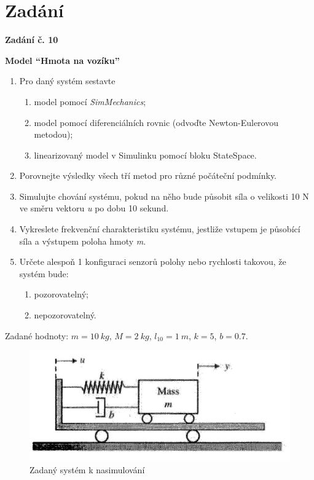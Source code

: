 \section{Zadání}

\textbf{Zadání č. 10}

\noindent \textbf{Model \enquote{Hmota na vozíku}}

\begin{enumerate}
    \item Pro daný systém sestavte
    
    \begin{enumerate}[label=\alph*)]
        \item model pomocí \textit{SimMechanics};
        \item model pomocí diferenciálních rovnic (odvoďte Newton-Eulerovou metodou);
        \item linearizovaný model v Simulinku pomocí bloku StateSpace.
    \end{enumerate}
    
    \item Porovnejte výsledky všech tří metod pro různé počáteční podmínky.
    \item Simulujte chování systému, pokud na něho bude působit síla o velikosti 10 N ve směru vektoru \textit{u} po dobu 10 sekund.
    \item Vykreslete frekvenční charakteristiku systému, jestliže vstupem je působící síla a výstupem poloha hmoty \textit{m}.
    \item Určete alespoň 1 konfiguraci senzorů polohy nebo rychlosti takovou, že systém bude:
    
    \begin{enumerate}[label=\alph*)]
        \item pozorovatelný;
        \item nepozorovatelný.
    \end{enumerate}
\end{enumerate}

Zadané hodnoty: \( m = 10 \: kg \), \( M = 2 \: kg \), \( l_{10} = 1 \: m \), \( k = 5 \), \( b = 0.7 \).

\begin{figure}[htbp]
	\centering
	\includegraphics[scale=1]{img/model.jpg}
	\caption{Zadaný systém k nasimulování}
\end{figure}
\FloatBarrier

